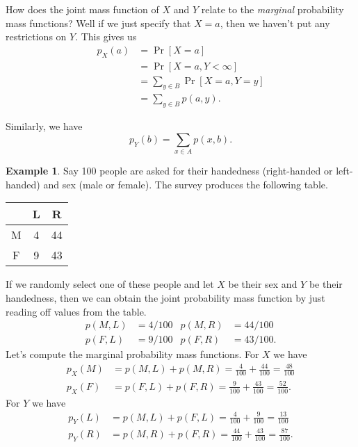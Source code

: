 \documentclass[12pt]{article}
\theoremstyle{plain}
\theoremstyle{definition}
\newtheorem{example}[theorem]{Example}
\theoremstyle{remark}
\begin{document}
How does the joint mass function of $X$ and $Y$ relate to the \emph{marginal} probability mass functions?
Well if we just specify that $X = a$, then we haven't put any restrictions on $Y$.
This gives us
\begin{equation}
\begin{split}
    p_X(a) &= \Pr[X= a]\\
    &= \Pr[X = a, Y<\infty]\\
    &= \sum_{y\in B}\Pr[X = a, Y = y]\\
    &= \sum_{y\in B}p(a, y).
\end{split}
\end{equation}

Similarly, we have
\[
    p_Y(b) = \sum_{x\in A}p(x, b).
\]

\begin{example}
    Say 100 people are asked for their handedness (right-handed or left-handed) and sex (male or female).
    The survey produces the following table.
    \begin{center}
    \begin{tabular}{|c || c | c|}
        \hline
           & L & R\\
        \hline
         M & 4 & 44\\
         F & 9 & 43\\
         \hline
    \end{tabular}
    \end{center}
    If we randomly select one of these people and let $X$ be their sex and $Y$ be their handedness, then we can obtain the joint probability mass function by just reading off values from the table.
    \begin{align*}
        p(M, L) &= 4/100  &  p(M, R) &= 44/100\\
        p(F, L) &= 9/100  &  p(F, R) &= 43/100.
    \end{align*}
    Let's compute the marginal probability mass functions.
    For $X$ we have
    \begin{align*}
        p_X(M) &= p(M, L) + p(M, R) = \frac{4}{100} + \frac{44}{100} = \frac{48}{100}\\
        p_X(F) &= p(F, L) + p(F, R) = \frac{9}{100} + \frac{43}{100} = \frac{52}{100}.
    \end{align*}
    For $Y$ we have
    \begin{align*}
        p_Y(L) &= p(M, L) + p(F, L) = \frac{4}{100} + \frac{9}{100} = \frac{13}{100}\\
        p_Y(R) &= p(M, R) + p(F, R) = \frac{44}{100} + \frac{43}{100} = \frac{87}{100}.
    \end{align*}
\end{example}
\end{document}
